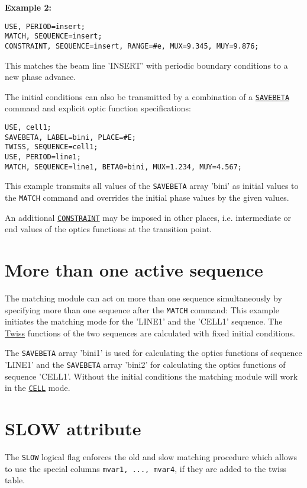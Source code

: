 \textbf{Example 2:}	
\begin{verbatim}
USE, PERIOD=insert;
MATCH, SEQUENCE=insert;
CONSTRAINT, SEQUENCE=insert, RANGE=#e, MUX=9.345, MUY=9.876;
\end{verbatim}
This matches the beam line 'INSERT' with periodic boundary conditions to
a new phase advance. 

The initial conditions can also be transmitted by a combination of a
\hyperref[sec:savebeta]{\texttt{SAVEBETA}} command and explicit
optic function specifications: 
\begin{verbatim}
USE, cell1;
SAVEBETA, LABEL=bini, PLACE=#E;
TWISS, SEQUENCE=cell1;
USE, PERIOD=line1;
MATCH, SEQUENCE=line1, BETA0=bini, MUX=1.234, MUY=4.567;
\end{verbatim}

This example transmits all values of the \texttt{SAVEBETA} array 'bini' as
initial values to the \texttt{MATCH} command and overrides the initial phase
values by the given values.

An additional \hyperref[sec:constraint]{\texttt{CONSTRAINT}} may be
imposed in other places, i.e. intermediate or end values of the optics
functions at the transition point.  
 
\section{More than one active sequence}

The matching module can act on more than one sequence simultaneously by
specifying more than one sequence after the \texttt{MATCH} command: 
This example initiates the matching mode for the 'LINE1' and the 'CELL1'
sequence. The \hyperref[chap:twiss]{Twiss} functions of the
two sequences are calculated with fixed initial conditions. 

The \texttt{SAVEBETA} array 'bini1' is used for calculating the optics
functions of sequence 'LINE1' and the \texttt{SAVEBETA} array 'bini2'
for calculating the optics functions of sequence 'CELL1'. Without the
initial conditions the matching module will work in the
\hyperref[sec:cell]{\texttt{CELL}} mode. 
 
\section{SLOW attribute}

The \texttt{SLOW} logical flag enforces the old and slow matching procedure
which allows to use the special columns \texttt{mvar1, ..., mvar4}, if they
are added to the twiss table.

